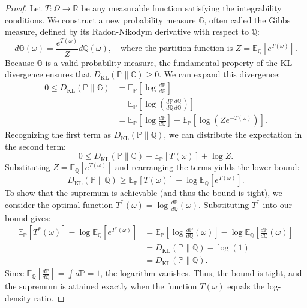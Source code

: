 \begin{proof}
Let $T: \Omega \to \mathbb{R}$ be any measurable function satisfying the integrability conditions. We construct a new probability measure $\mathbb{G}$, often called the Gibbs measure, defined by its Radon-Nikodym derivative with respect to $\mathbb{Q}$:
\begin{equation}
    d\mathbb{G}(\omega) = \frac{e^{T(\omega)}}{Z} d\mathbb{Q}(\omega), \quad \text{where the partition function is } Z = \mathbb{E}_{\mathbb{Q}}[e^{T(\omega)}].
\end{equation}
Because $\mathbb{G}$ is a valid probability measure, the fundamental property of the KL divergence ensures that $D_{\text{KL}}(\mathbb{P} \parallel \mathbb{G}) \geq 0$. We can expand this divergence:
\begin{align}
    0 \leq D_{\text{KL}}(\mathbb{P} \parallel \mathbb{G}) &= \mathbb{E}_{\mathbb{P}} \left[ \log \frac{d\mathbb{P}}{d\mathbb{G}} \right] \\
    &= \mathbb{E}_{\mathbb{P}} \left[ \log \left( \frac{d\mathbb{P}}{d\mathbb{Q}} \frac{d\mathbb{Q}}{d\mathbb{G}} \right) \right] \\
    &= \mathbb{E}_{\mathbb{P}} \left[ \log \frac{d\mathbb{P}}{d\mathbb{Q}} \right] + \mathbb{E}_{\mathbb{P}} \left[ \log \left( Z e^{-T(\omega)} \right) \right].
\end{align}
Recognizing the first term as $D_{\text{KL}}(\mathbb{P} \parallel \mathbb{Q})$, we can distribute the expectation in the second term:
\begin{equation}
    0 \leq D_{\text{KL}}(\mathbb{P} \parallel \mathbb{Q}) - \mathbb{E}_{\mathbb{P}}[T(\omega)] + \log Z.
\end{equation}
Substituting $Z = \mathbb{E}_{\mathbb{Q}}[e^{T(\omega)}]$ and rearranging the terms yields the lower bound:
\begin{equation}
    D_{\text{KL}}(\mathbb{P} \parallel \mathbb{Q}) \geq \mathbb{E}_{\mathbb{P}}[T(\omega)] - \log \mathbb{E}_{\mathbb{Q}}[e^{T(\omega)}].
\end{equation}
To show that the supremum is achievable (and thus the bound is tight), we consider the optimal function $T^*(\omega) = \log \frac{d\mathbb{P}}{d\mathbb{Q}}(\omega)$. Substituting $T^*$ into our bound gives:
\begin{align}
    \mathbb{E}_{\mathbb{P}}[T^*(\omega)] - \log \mathbb{E}_{\mathbb{Q}}[e^{T^*(\omega)}] &= \mathbb{E}_{\mathbb{P}}\left[ \log \frac{d\mathbb{P}}{d\mathbb{Q}}(\omega) \right] - \log \mathbb{E}_{\mathbb{Q}}\left[ \frac{d\mathbb{P}}{d\mathbb{Q}}(\omega) \right] \\
    &= D_{\text{KL}}(\mathbb{P} \parallel \mathbb{Q}) - \log (1) \\
    &= D_{\text{KL}}(\mathbb{P} \parallel \mathbb{Q}).
\end{align}
Since $\mathbb{E}_{\mathbb{Q}}[\frac{d\mathbb{P}}{d\mathbb{Q}}] = \int d\mathbb{P} = 1$, the logarithm vanishes. Thus, the bound is tight, and the supremum is attained exactly when the function $T(\omega)$ equals the log-density ratio.
\end{proof}


